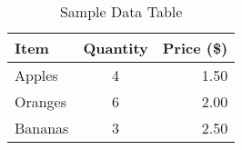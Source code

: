 \begin{table}[htbp]
\centering
\begin{tabular}{|l|c|r|}
\hline
\textbf{Item} & \textbf{Quantity} & \textbf{Price (\$)} \\
\hline
Apples & 4 & 1.50 \\
Oranges & 6 & 2.00 \\
Bananas & 3 & 2.50 \\
\hline
\end{tabular}
\caption{Sample Data Table}
\label{tab:tab001}
\end{table}